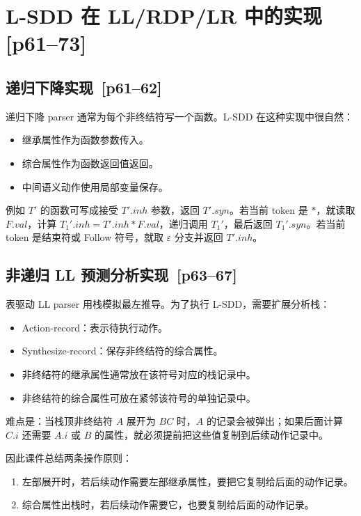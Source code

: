 \documentclass[UTF8,fontset=none,11pt]{ctexart}
\newcommand{\pg}[1]{\texorpdfstring{{\small\color{graytext}\,[p#1]}}{ [p#1]}}
\newcommand{\eps}{\varepsilon}
\begin{document}
\section{L-SDD 在 LL/RDP/LR 中的实现 \pg{61--73}}

\subsection{递归下降实现 \pg{61--62}}

递归下降 parser 通常为每个非终结符写一个函数。L-SDD 在这种实现中很自然：

\begin{itemize}
  \item 继承属性作为函数参数传入。
  \item 综合属性作为函数返回值返回。
  \item 中间语义动作使用局部变量保存。
\end{itemize}

例如 \(T'\) 的函数可写成接受 \(T'.inh\) 参数，返回 \(T'.syn\)。若当前 token 是 \(*\)，就读取 \(F.val\)，计算 \(T_1'.inh=T'.inh*F.val\)，递归调用 \(T_1'\)，最后返回 \(T_1'.syn\)。若当前 token 是结束符或 Follow 符号，就取 \(\eps\) 分支并返回 \(T'.inh\)。

\subsection{非递归 LL 预测分析实现 \pg{63--67}}

表驱动 LL parser 用栈模拟最左推导。为了执行 L-SDD，需要扩展分析栈：

\begin{itemize}
  \item Action-record：表示待执行动作。
  \item Synthesize-record：保存非终结符的综合属性。
  \item 非终结符的继承属性通常放在该符号对应的栈记录中。
  \item 非终结符的综合属性可放在紧邻该符号的单独记录中。
\end{itemize}

难点是：当栈顶非终结符 \(A\) 展开为 \(BC\) 时，\(A\) 的记录会被弹出；如果后面计算 \(C.i\) 还需要 \(A.i\) 或 \(B\) 的属性，就必须提前把这些值复制到后续动作记录中。

因此课件总结两条操作原则：

\begin{enumerate}
  \item 左部展开时，若后续动作需要左部继承属性，要把它复制给后面的动作记录。
  \item 综合属性出栈时，若后续动作需要它，也要复制给后面的动作记录。
\end{enumerate}
\end{document}
